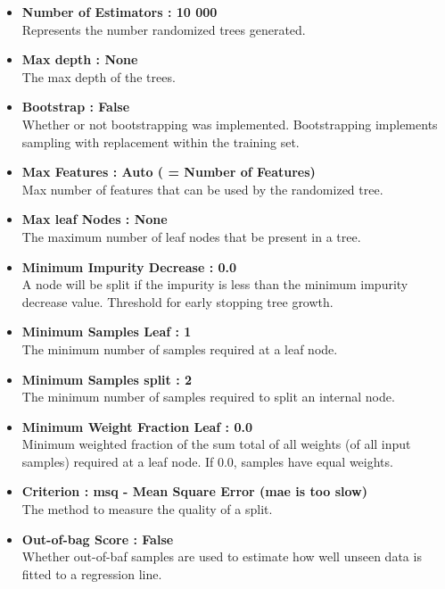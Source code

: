 \documentclass[a4paper,11pt]{report}
\numberwithin{figure}{section} %
\begin{document}
    \begin{itemize}
        \item[\textbullet] \textbf{Number of Estimators : 10 000}\\
        Represents the number randomized trees generated.
        \item[\textbullet] \textbf{Max depth : None}\\
        The max depth of the trees.
        \item[\textbullet] \textbf{Bootstrap : False}\\
        Whether or not bootstrapping was implemented.
        Bootstrapping implements sampling with replacement within the training set.
        \item[\textbullet] \textbf{Max Features : Auto ( = Number of Features)}\\
        Max number of features that can be used by the randomized tree.
        \item[\textbullet] \textbf{Max leaf Nodes : None}\\
        The maximum number of leaf nodes that be present in a tree.
        \item[\textbullet] \textbf{Minimum Impurity Decrease : 0.0}\\
        A node will be split if the impurity is less than the minimum impurity decrease value.
        Threshold for early stopping tree growth.
        \item[\textbullet] \textbf{Minimum Samples Leaf : 1}\\
        The minimum number of samples required at a leaf node.
        \item[\textbullet] \textbf{Minimum Samples split : 2}\\
        The minimum number of samples required to split an internal node.
        \item[\textbullet] \textbf{Minimum Weight Fraction Leaf : 0.0}\\
        Minimum weighted fraction of the sum total of all weights (of all input samples) required at a leaf node.
        If 0.0, samples have equal weights.
        \item[\textbullet] \textbf{Criterion : msq - Mean Square Error (mae is too slow)}\\
        The method to measure the quality of a split.
        \item[\textbullet] \textbf{Out-of-bag Score : False}\\
        Whether out-of-baf samples are used to estimate how well unseen data is fitted to a regression line.
    \end{itemize}
\end{document}
